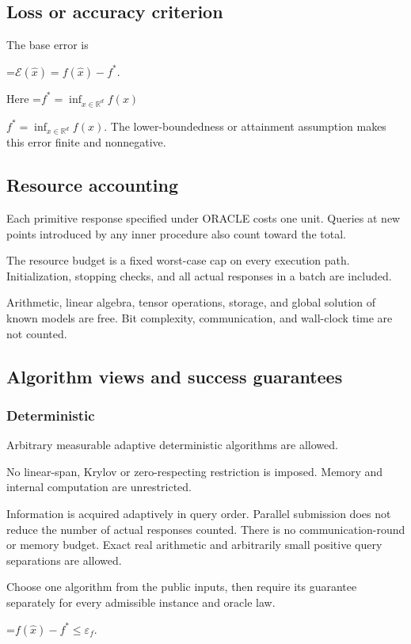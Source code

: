 \documentclass[10pt,a4paper]{article}
\newcommand{\AtlasMath}[1]{\par\begingroup\centering\setbox0=\hbox{$\displaystyle #1$}\ifdim\wd0>1.4\linewidth\typeout{ATLAS WIDE FORMULA: \the\wd0}\fi\ifdim\wd0>\linewidth\resizebox{\linewidth}{!}{\box0}\else\box0\fi\par\endgroup}
\newcommand{\AtlasInlineMath}[1]{\begingroup\setbox0=\hbox{$#1$}\ifdim\wd0>.4\linewidth\endgroup\AtlasMath{#1}\else\endgroup$#1$\fi}
\begin{document}
\subsection{Loss or accuracy criterion}
The base error is


\AtlasMath{\mathcal{E}(\widehat{x})=f(\widehat{x})-f^*.}


Here \AtlasInlineMath{f^*=\inf_{x\in \mathbb{R}^d}f(x)}. The lower-boundedness or attainment assumption makes this error finite and nonnegative.

\subsection{Resource accounting}
Each primitive response specified under ORACLE costs one unit. Queries at new points introduced by any inner procedure also count toward the total.

The resource budget is a fixed worst-case cap on every execution path. Initialization, stopping checks, and all actual responses in a batch are included.

Arithmetic, linear algebra, tensor operations, storage, and global solution of known models are free. Bit complexity, communication, and wall-clock time are not counted.

\subsection{Algorithm views and success guarantees}
\subsubsection{Deterministic}
Arbitrary measurable adaptive deterministic algorithms are allowed.

No linear-span, Krylov or zero-respecting restriction is imposed. Memory and internal computation are unrestricted.

Information is acquired adaptively in query order. Parallel submission does not reduce the number of actual responses counted. There is no communication-round or memory budget. Exact real arithmetic and arbitrarily small positive query separations are allowed.

Choose one algorithm from the public inputs, then require its guarantee separately for every admissible instance and oracle law.


\AtlasMath{f(\widehat{x})-f^*\le \varepsilon_f.}
\end{document}
